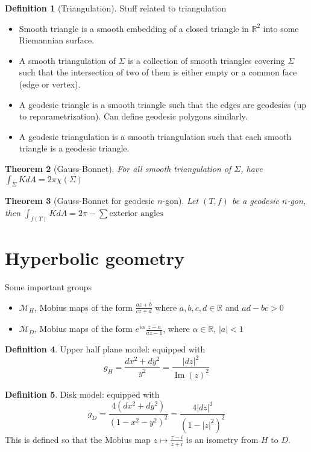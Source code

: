 \documentclass{article}
\theoremstyle{definition}
\newtheorem{defn}{Definition}[section]
\theoremstyle{remark}
\theoremstyle{plain}
\newtheorem{thm}[defn]{Theorem}
\theoremstyle{definition}
\newcommand{\RR}{\mathbb{R}}
\begin{document}
\begin{defn}[Triangulation]
Stuff related to triangulation
\begin{itemize}
    \item Smooth triangle is a smooth embedding of a closed triangle in $\RR^2$ into some Riemannian surface.\
    \item A smooth triangulation of $\Sigma$ is a collection of smooth triangles covering $\Sigma$ such that the intersection of two of them is either empty or a common face (edge or vertex).
    \item A geodesic triangle is a smooth triangle such that the edges are geodesics (up to reparametrization). Can define geodesic polygons similarly.
    \item A geodesic triangulation is a smooth triangulation such that each smooth triangle is a geodesic triangle.
\end{itemize}
      
\end{defn}
\begin{thm}[Gauss-Bonnet]
    For all smooth triangulation of $\Sigma$, have $\int_\Sigma KdA=2\pi\chi(\Sigma)$
\end{thm}
\begin{thm}[Gauss-Bonnet for geodesic $n$-gon]
    Let $(T,f)$ be a geodesic $n$-gon, then $\int_{f(T)}KdA=2\pi-\sum\text{exterior angles}$
\end{thm}
\section{Hyperbolic geometry}
Some important groups
\begin{itemize}
    \item $\mathcal{M}_H$, Mobius maps of the form $\frac{az+b}{cz+d}$ where $a,b,c,d\in\RR$ and $ad-bc>0$
    \item $\mathcal{M}_D$, Mobius maps of the form $e^{i\alpha}\frac{z-a}{\bar az-1}$, where $\alpha\in\RR$, $|a|<1$
\end{itemize}

\begin{defn}
    Upper half plane model: equipped with 
    \[g_H=\dfrac{dx^2+dy^2}{y^2}=\dfrac{|dz|^2}{\operatorname{Im}(z)^2}\]
\end{defn}
\begin{defn}
    Disk model: equipped with
    \[g_D=\dfrac{4(dx^2+dy^2)}{(1-x^2-y^2)^2}=\dfrac{4|dz|^2}{(1-|z|^2)^2}\]
    This is defined so that the Mobius map $z\mapsto \frac{z-i}{z+i}$ is an isometry from $H$ to $D$.
\end{defn}
\end{document}
